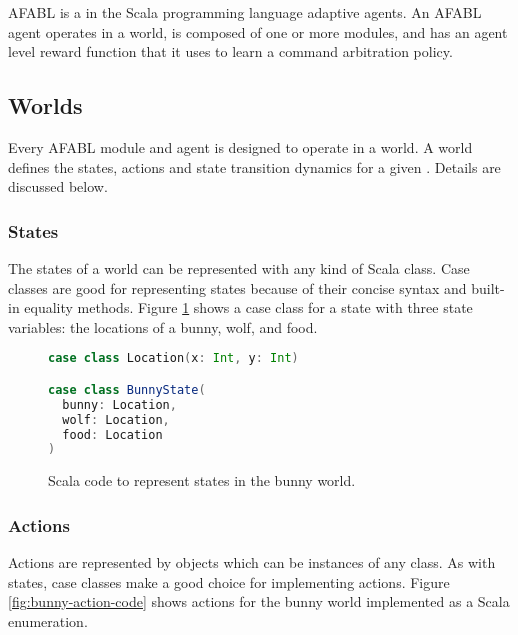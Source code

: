 AFABL is a  in the Scala programming language  adaptive agents. An AFABL agent operates in a world, is composed of one or more modules, and has an agent level reward function that it uses to learn a command arbitration policy.

\subsection{Worlds}

Every AFABL module and agent is designed to operate in a world. A world defines the states, actions and state transition dynamics for a given . Details are discussed below.

\subsubsection{States}

The states of a world can be represented with any kind of Scala class. Case classes are good for representing states because of their concise syntax and built-in equality methods. Figure \ref{fig:bunny-state-code} shows a case class for a state with three state variables: the locations of a bunny, wolf, and food.

\begin{figure}[!h]
\begin{center}

\begin{lstlisting}[language=Scala]
case class Location(x: Int, y: Int)

case class BunnyState(
  bunny: Location,
  wolf: Location,
  food: Location
)
\end{lstlisting}

\caption{Scala code to represent states in the bunny world.}
\end{center}
\label{fig:bunny-state-code}
\end{figure}

\subsubsection{Actions}

Actions are represented by objects which can be instances of any class. As with states, case classes make a good choice for implementing actions. Figure \ref{fig:bunny-action-code} shows actions for the bunny world implemented as a Scala enumeration.

